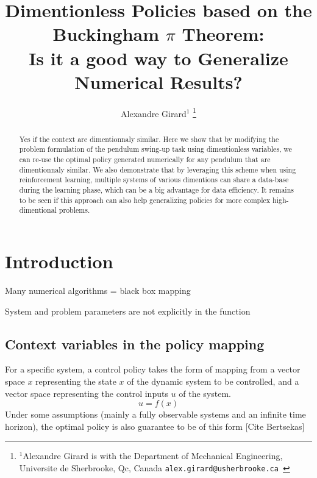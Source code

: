 

\title{\LARGE \bf
Dimentionless Policies based on the Buckingham $\pi$ Theorem: \\ 
Is it a good way to Generalize Numerical Results?
}


\author{Alexandre Girard$^{1}$%
\thanks{$^{1}$Alexandre Girard is with the Department of Mechanical Engineering, Universite de Sherbrooke, Qc, Canada {\tt\small  alex.girard@usherbrooke.ca }}%
}%


\maketitle
\thispagestyle{empty}
\pagestyle{empty}


\begin{abstract}
Yes if the context are dimentionnaly similar. Here we show that by modifying the problem formulation of the pendulum swing-up task using dimentionless variables, we can re-use the optimal policy generated numerically for any pendulum that are dimentionnaly similar. We also demonstrate that by leveraging this scheme when using reinforcement learning, multiple systems of various dimentions can share a data-base during the learning phase, which can be a big advantage for data efficiency. It remains to be seen if this approach can also help generalizing policies for more complex high-dimentional problems.
\end{abstract}

\section{Introduction}

Many numerical algorithms = black box mapping

System and problem parameters are not explicitly in the function




\subsection{Context variables in the policy mapping}

For a specific system, a control policy takes the form of mapping from a vector space $x$ representing the state $x$ of the dynamic system to be controlled, and a vector space representing the control inputs $u$ of the system. 
\begin{equation}
u
=
f \left(
x
\right)
\end{equation}
Under some assumptions (mainly a fully observable systems and an infinite time horizon), the optimal policy is also guarantee to be of this form [Cite Bertsekas]

